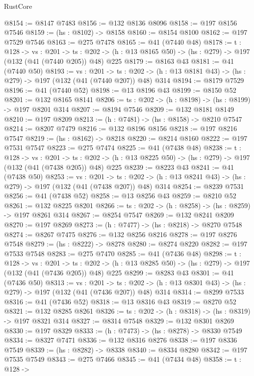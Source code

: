 \begin{lexlean}{RustCore}
\begin{coremodule}
@8154 := @8147 @7483
@8156 := @132 @8136 @8096
@8158 := @197 @8156 @7546
@8159 := (hs : @8102) -> @8158
@8160 := @8154 @8100
@8162 := @197 @7529 @7546
@8163 := @275 @7478
@8165 := @41 (@7440 @48)
@8178 := {t : @128} ->
  {vs : @201} ->
  {ts : @202} -> (h : @13 @8165 @50) -> (hs : @279) -> @197 (@132 (@41 (@7440 @205)) @48) @225
@8179 := @8163 @43
@8181 := @41 (@7440 @50)
@8193 := {vs : @201} ->
  {ts : @202} -> (h : @13 @8181 @43) -> (hs : @279) -> @197 (@132 (@41 (@7440 @207)) @48) @314
@8194 := @8179 @7529
@8196 := @41 (@7440 @52)
@8198 := @13 @8196 @43
@8199 := @8150 @52
@8201 := @132 @8165 @8141
@8206 := {ts : @202} -> (h : @8198) -> (hs : @8199) -> @197 @8201 @314
@8207 := @8194 @7546
@8209 := @132 @8181 @8149
@8210 := @197 @8209
@8213 := (h : @7481) -> (hs : @8158) -> @8210 @7547
@8214 := @8207 @7479
@8216 := @132 @8196 @8156
@8218 := @197 @8216 @7547
@8219 := (hs : @8162) -> @8218
@8220 := @8214 @8160
@8222 := @197 @7531 @7547
@8223 := @275 @7474
@8225 := @41 (@7438 @48)
@8238 := {t : @128} ->
  {vs : @201} ->
  {ts : @202} -> (h : @13 @8225 @50) -> (hs : @279) -> @197 (@132 (@41 (@7438 @205)) @48) @225
@8239 := @8223 @43
@8241 := @41 (@7438 @50)
@8253 := {vs : @201} ->
  {ts : @202} -> (h : @13 @8241 @43) -> (hs : @279) -> @197 (@132 (@41 (@7438 @207)) @48) @314
@8254 := @8239 @7531
@8256 := @41 (@7438 @52)
@8258 := @13 @8256 @43
@8259 := @8210 @52
@8261 := @132 @8225 @8201
@8266 := {ts : @202} -> (h : @8258) -> (hs : @8259) -> @197 @8261 @314
@8267 := @8254 @7547
@8269 := @132 @8241 @8209
@8270 := @197 @8269
@8273 := (h : @7477) -> (hs : @8218) -> @8270 @7548
@8274 := @8267 @7475
@8276 := @132 @8256 @8216
@8278 := @197 @8276 @7548
@8279 := (hs : @8222) -> @8278
@8280 := @8274 @8220
@8282 := @197 @7533 @7548
@8283 := @275 @7470
@8285 := @41 (@7436 @48)
@8298 := {t : @128} ->
  {vs : @201} ->
  {ts : @202} -> (h : @13 @8285 @50) -> (hs : @279) -> @197 (@132 (@41 (@7436 @205)) @48) @225
@8299 := @8283 @43
@8301 := @41 (@7436 @50)
@8313 := {vs : @201} ->
  {ts : @202} -> (h : @13 @8301 @43) -> (hs : @279) -> @197 (@132 (@41 (@7436 @207)) @48) @314
@8314 := @8299 @7533
@8316 := @41 (@7436 @52)
@8318 := @13 @8316 @43
@8319 := @8270 @52
@8321 := @132 @8285 @8261
@8326 := {ts : @202} -> (h : @8318) -> (hs : @8319) -> @197 @8321 @314
@8327 := @8314 @7548
@8329 := @132 @8301 @8269
@8330 := @197 @8329
@8333 := (h : @7473) -> (hs : @8278) -> @8330 @7549
@8334 := @8327 @7471
@8336 := @132 @8316 @8276
@8338 := @197 @8336 @7549
@8339 := (hs : @8282) -> @8338
@8340 := @8334 @8280
@8342 := @197 @7535 @7549
@8343 := @275 @7466
@8345 := @41 (@7434 @48)
@8358 := {t : @128} ->

\end{coremodule}
\end{lexlean}
